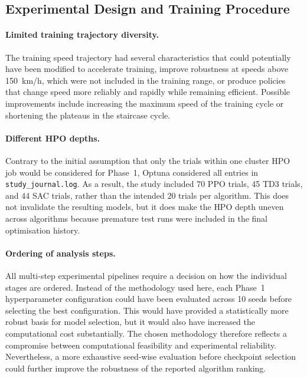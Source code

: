 \subsection{Experimental Design and Training Procedure}

\paragraph{Limited training trajectory diversity.} The training speed trajectory had several characteristics that could potentially have been modified to accelerate training, improve robustness at speeds above 150~km/h, which were not included in the training range, or produce policies that change speed more reliably and rapidly while remaining efficient. Possible improvements include increasing the maximum speed of the training cycle or shortening the plateaus in the staircase cycle.

\paragraph{Different HPO depths.} Contrary to the initial assumption that only the trials within one cluster \ac{HPO} job would be considered for Phase~1, Optuna considered all entries in \texttt{study\_journal.log}. As a result, the study included 70 PPO trials, 45 TD3 trials, and 44 SAC trials, rather than the intended 20 trials per algorithm. This does not invalidate the resulting models, but it does make the \ac{HPO} depth uneven across algorithms because premature test runs were included in the final optimisation history.

\paragraph{Ordering of analysis steps.} All multi-step experimental pipelines require a decision on how the individual stages are ordered. Instead of the methodology used here, each Phase~1 hyperparameter configuration could have been evaluated across 10 seeds before selecting the best configuration. This would have provided a statistically more robust basis for model selection, but it would also have increased the computational cost substantially. The chosen methodology therefore reflects a compromise between computational feasibility and experimental reliability. Nevertheless, a more exhaustive seed-wise evaluation before checkpoint selection could further improve the robustness of the reported algorithm ranking.

